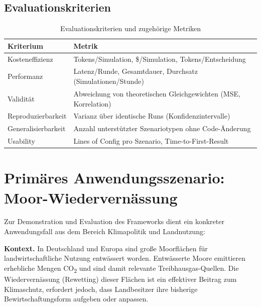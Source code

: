 \documentclass[12pt, a4paper]{article}
\begin{document}
\subsection{Evaluationskriterien}

\begin{table}[h!]
    \centering
    \begin{tabularx}{\textwidth}{lX}
        \toprule
        \textbf{Kriterium} & \textbf{Metrik} \\
        \midrule
        Kosteneffizienz        & Tokens/Simulation, \$/Simulation, Tokens/Entscheidung \\
        Performanz             & Latenz/Runde, Gesamtdauer, Durchsatz (Simulationen/Stunde) \\
        Validität              & Abweichung von theoretischen Gleichgewichten (MSE, Korrelation) \\
        Reproduzierbarkeit     & Varianz über identische Runs (Konfidenzintervalle) \\
        Generalisierbarkeit    & Anzahl unterstützter Szenariotypen ohne Code-Änderung \\
        Usability              & Lines of Config pro Szenario, Time-to-First-Result \\
        \bottomrule
    \end{tabularx}
    \caption{Evaluationskriterien und zugehörige Metriken}
    \label{tab:eval}
\end{table}

\section{Primäres Anwendungsszenario: Moor-Wiedervernässung}
\label{sec:usecase}

Zur Demonstration und Evaluation des Frameworks dient ein konkreter Anwendungsfall aus dem Bereich Klimapolitik und Landnutzung:

\textbf{Kontext.} In Deutschland und Europa sind große Moorflächen für landwirtschaftliche Nutzung entwässert worden. Entwässerte Moore emittieren erhebliche Mengen CO\textsubscript{2} und sind damit relevante Treibhausgas-Quellen. Die Wiedervernässung (Rewetting) dieser Flächen ist ein effektiver Beitrag zum Klimaschutz, erfordert jedoch, dass Landbesitzer ihre bisherige Bewirtschaftungsform aufgeben oder anpassen.
\end{document}
